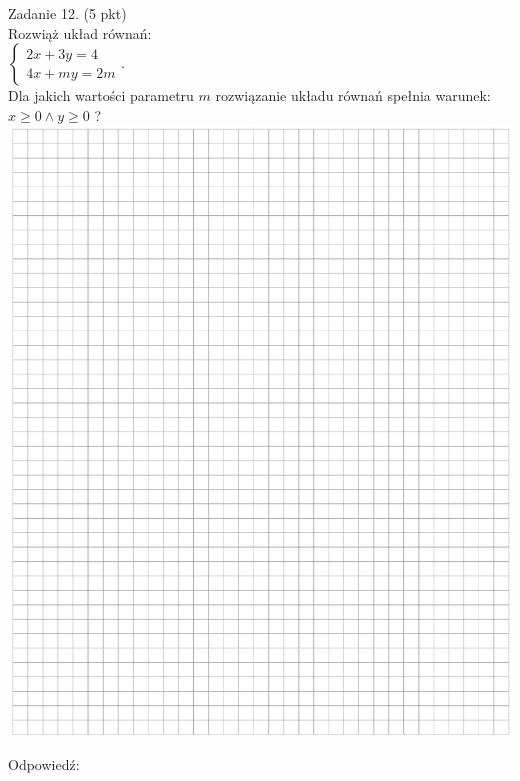 \documentclass[10pt]{article}
\begin{document}
Zadanie 12. (5 pkt)\\
Rozwiąż układ równań:\\
\(\left\{\begin{array}{l}2 x+3 y=4 \\ 4 x+m y=2 m\end{array}\right.\).\\
Dla jakich wartości parametru \(m\) rozwiązanie układu równań spełnia warunek: \(x \geq 0 \wedge y \geq 0\) ?\\
\includegraphics[max width=\textwidth, center]{2024_11_21_caad0d2d07cc5c30818fg-10}

Odpowiedź:
\end{document}
